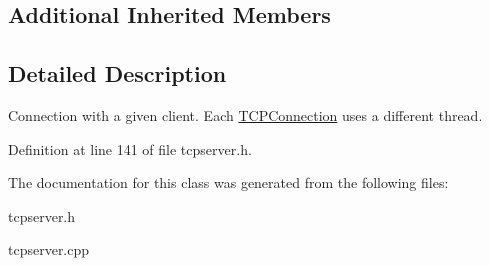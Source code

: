\subsection*{Additional Inherited Members}


\subsection{Detailed Description}
Connection with a given client. Each \mbox{\hyperlink{classcppu_1_1_t_c_p_connection}{T\+C\+P\+Connection}} uses a different thread. 

Definition at line 141 of file tcpserver.\+h.



The documentation for this class was generated from the following files\+:\begin{DoxyCompactItemize}
\item 
tcpserver.\+h\item 
tcpserver.\+cpp\end{DoxyCompactItemize}
